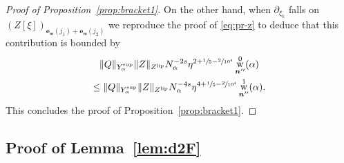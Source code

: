 \documentclass[10pt,a4paper]{amsart}
\DeclareMathOperator{\rw}{w}
\theoremstyle{plain}
\theoremstyle{definition}
\newcommand{\nb}{{\boldsymbol n}}
\newcommand{\1}{\mathbf{1}}
\newcommand{\Ysup}[1]{Y_{#1}^{\mathrm{sup}}}
\providecommand{\Subsection}{\subsection}
\begin{document}
\begin{proof}[Proof of Proposition~\ref{prop:bracket1}]
\pagebreak[2]
On the other hand, when $\partial_{\xi_{k}}$ falls on $(Z[\xi])_{\boldsymbol{e}_{\mathfrak{m}}(j_{1})+\boldsymbol{e}_{\mathfrak{m}}(j_{2})}$ we reproduce the proof of \eqref{eq:pr-z} to deduce that this contribution is bounded by
\begin{multline*}
\|Q\|_{\Ysup{\alpha}}
\| Z\|_{Z^{\mathrm{lip}}}
N_{\alpha}^{-2s}\eta^{2+\sfrac{1}{5}-\sfrac{2}{10^{4}}}
\rw_{\nb''}^{0}(\alpha)\\
\leq
\|Q\|_{\Ysup{\alpha}}
\| Z\|_{Z^{\mathrm{lip}}}
N_{\alpha}^{-4s}\eta^{4+\sfrac{1}{5}-\sfrac{2}{10^{4}}}
\rw_{\nb''}^{1}(\alpha).
\end{multline*}
This concludes the proof of Proposition~\ref{prop:bracket1}.
\end{proof}

\Subsection{Proof of Lemma~\ref{lem:d2F}}
\label{sub:d2F}
\end{document}
